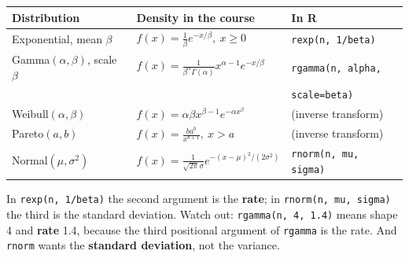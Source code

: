 \begin{center}
\small
\begin{tabular}{lll}
\toprule
Distribution & Density in the course & In R \\
\midrule
Exponential, mean $\beta$ & $f(x) = \frac{1}{\beta}e^{-x/\beta},\ x\ge 0$ & \texttt{rexp(n, 1/beta)} \\
Gamma$(\alpha,\beta)$, scale $\beta$ & $f(x) = \frac{1}{\beta^\alpha\Gamma(\alpha)}x^{\alpha-1}e^{-x/\beta}$ & \texttt{rgamma(n, alpha,}\\ & & \quad\texttt{scale=beta)} \\
Weibull$(\alpha,\beta)$ & $f(x) = \alpha\beta x^{\beta-1}e^{-\alpha x^\beta}$ & (inverse transform) \\
Pareto$(a,b)$ & $f(x) = \frac{b a^b}{x^{b+1}},\ x > a$ & (inverse transform) \\
Normal$(\mu,\sigma^2)$ & $f(x) = \frac{1}{\sqrt{2\pi}\sigma}e^{-(x-\mu)^2/(2\sigma^2)}$ & \texttt{rnorm(n, mu, sigma)} \\
\bottomrule
\end{tabular}
\end{center}
In \texttt{rexp(n, 1/beta)} the second argument is the \textbf{rate}; in \texttt{rnorm(n, mu, sigma)} the third is the standard deviation. Watch out: \texttt{rgamma(n, 4, 1.4)} means shape 4 and \textbf{rate} 1.4, because the third positional argument of \texttt{rgamma} is the rate. And \texttt{rnorm} wants the \textbf{standard deviation}, not the variance.

\newpage
